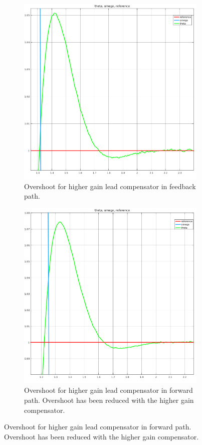 \documentclass[11pt,a4paper]{article}
\begin{document}
\begin{figure}[!htbp]
	\centering
	\begin{subfigure}{.5\textwidth}
		\centering
		\includegraphics[width = \textwidth]{imglab/lab4sol_leadtrajfeedbackhighgainclose.png}
		\caption{Overshoot for higher gain lead compensator in feedback path.}
	\end{subfigure}%
	\begin{subfigure}{.5\textwidth}
		\centering
		\includegraphics[width = \textwidth]{imglab/lab4sol_leadtrajforwardhighgainclose.png}
		\caption{Overshoot for higher gain lead compensator in forward path. Overshoot has been reduced with the higher gain compensator.}	
	\end{subfigure}
\end{figure}
\end{document}

